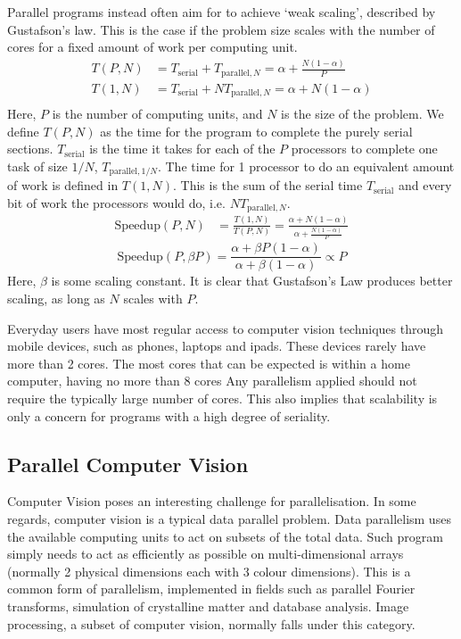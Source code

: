\documentclass[../main.tex]{subfiles}
\begin{document}
    Parallel programs instead often aim for to achieve `weak scaling', described by Gustafson's law.
    This is the case if the problem size scales with the number of cores for a fixed amount of work per computing unit.
    \begin{align*}
      T(P,N) &= T_\text{serial} + T_{\text{parallel},N} = \alpha + \frac{N(1-\alpha)}{P} \\
      T(1,N) &= T_\text{serial} + NT_{\text{parallel},N} = \alpha + N(1-\alpha) \\
    \end{align*}
    Here, $P$ is the number of computing units, and $N$ is the size of the problem.
    We define $T(P,N)$ as the time for the program to complete the purely serial sections.
    $T_\text{serial}$ is the time it takes for each of the $P$ processors to complete one task of size $1/N$, $T_{\text{parallel},1/N}$.
    The time for 1 processor to do an equivalent amount of work is defined in $T(1,N)$.
    This is the sum of the serial time $T_\text{serial}$ and every bit of work the processors would do, i.e. $NT_{\text{parallel},N}$.
    \begin{align*}
      \text{Speedup}(P,N) &= \frac{T(1,N)}{T(P,N)} = \frac{\alpha+N(1-\alpha)}{\alpha+\frac{N(1-\alpha)}{P}} 
    \end{align*}
    \begin{equation}
      \text{Speedup}(P,\beta P) = \frac{\alpha+\beta P(1-\alpha)}{\alpha+\beta(1-\alpha)} \propto P
      \label{gustafson}
    \end{equation}
    Here, $\beta$ is some scaling constant.
    It is clear that Gustafson's Law produces better scaling, as long as $N$ scales with $P$.

    Everyday users have most regular access to computer vision techniques through mobile devices, such as phones, laptops and ipads.
    These devices rarely have more than 2 cores.
    The most cores that can be expected is within a home computer, having no more than 8 cores
    Any parallelism applied should not require the typically large number of cores.
    This also implies that scalability is only a concern for programs with a high degree of seriality.
  \subsection{Parallel Computer Vision}
    Computer Vision poses an interesting challenge for parallelisation.
    In some regards, computer vision is a typical data parallel problem.
    Data parallelism uses the available computing units to act on subsets of the total data.
    Such program simply needs to act as efficiently as possible on multi-dimensional arrays (normally 2 physical dimensions each with 3 colour dimensions).
    This is a common form of parallelism, implemented in fields such as parallel Fourier transforms, simulation of crystalline matter and database analysis.
    Image processing, a subset of computer vision, normally falls under this category.
    
\end{document}

